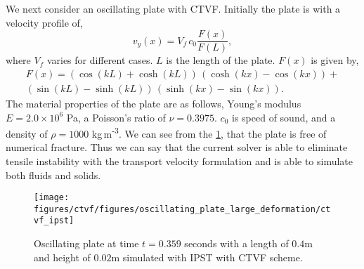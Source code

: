 We next consider an oscillating plate with CTVF. Initially the plate is with a velocity
profile of,
%
\begin{equation*}
  v_y(x) = V_f \, c_0 \frac{F(x)}{F(L)},
\end{equation*}
where $V_f$ varies for different cases. $L$ is the length of the plate. $F(x)$
is given by,
\begin{multline}
  F(x) = (\cos(kL) + \cosh(kL)) \, (\cosh(kx) - \cos(kx)) + \\
  (\sin(kL) - \sinh(kL)) \, (\sinh(kx) - \sin(kx)).
\end{multline}
%
The material properties of the plate are as follows, Young's modulus
$E=2.0\times 10^6$ Pa, a Poisson's ratio of $\nu=0.3975$. $c_0$ is speed of
sound, and a density of $\rho=1000$ kg\,m\textsuperscript{-3}. We can see from
the \cref{fig:oscillating-plate}, that the plate is free of numerical fracture.
Thus we can say that the current solver is able to eliminate tensile instability
with the transport velocity formulation and is able to simulate both fluids and
solids.
\begin{figure}[tpb]
  \centering
  \texttt{[image: figures/ctvf/figures/oscillating\_plate\_large\_deformation/ctvf\_ipst]}
  \caption{Oscillating plate at time $t=0.359$ seconds with a length of $0.4$m and
    height of $0.02$m simulated with IPST with CTVF scheme.}
\label{fig:oscillating-plate}
\end{figure}
